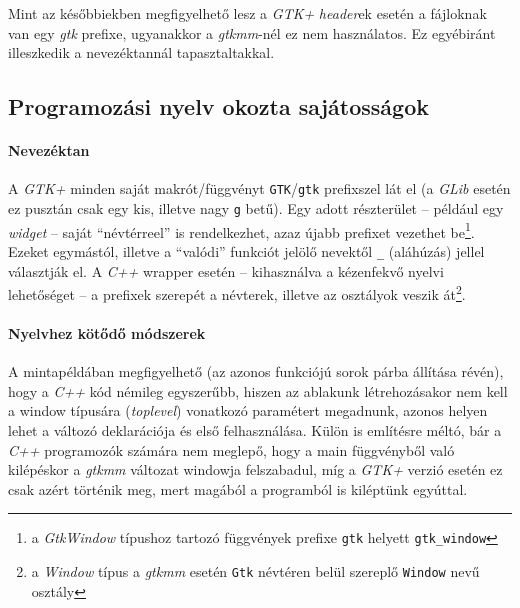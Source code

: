Mint az későbbiekben megfigyelhető lesz a \textit{GTK+} \textit{header}ek esetén a fájloknak van egy \textit{gtk} prefixe, ugyanakkor a \textit{gtkmm}-nél ez nem használatos. Ez egyébiránt illeszkedik a nevezéktannál tapasztaltakkal.

\subsection{Programozási nyelv okozta sajátosságok}

\paragraph{Nevezéktan}

A \textit{GTK+} minden saját makrót/függvényt \texttt{GTK}/\texttt{gtk} prefixszel lát el (a \textit{GLib} esetén ez pusztán csak egy kis, illetve nagy \texttt{g} betű). Egy adott részterület -- például egy \textit{widget} -- saját ``névtérreel'' is rendelkezhet, azaz újabb prefixet vezethet be\footnote{a \textit{GtkWindow} típushoz tartozó függvények prefixe \texttt{gtk} helyett \texttt{gtk\_window}}. Ezeket egymástól, illetve a ``valódi'' funkciót jelölő nevektől \texttt{\_} (aláhúzás) jellel választják el. A \textit{C++} wrapper esetén -- kihasználva a kézenfekvő nyelvi lehetőséget -- a prefixek szerepét a névterek, illetve az osztályok veszik át\footnote{a \textit{Window} típus a \textit{gtkmm} esetén \texttt{Gtk} névtéren belül szereplő \texttt{Window} nevű osztály}.

\paragraph{Nyelvhez kötődő módszerek}

A mintapéldában megfigyelhető (az azonos funkciójú sorok párba állítása révén), hogy a \textit{C++} kód némileg egyszerűbb, hiszen az ablakunk létrehozásakor nem kell a window típusára (\textit{toplevel}) vonatkozó paramétert megadnunk, azonos helyen lehet a változó deklarációja és első felhasználása. Külön is említésre méltó, bár a \textit{C++} programozók számára nem meglepő, hogy a main függvényből való kilépéskor a \textit{gtkmm} változat windowja felszabadul, míg a \textit{GTK+} verzió esetén ez csak azért történik meg, mert magából a programból is kiléptünk egyúttal.
